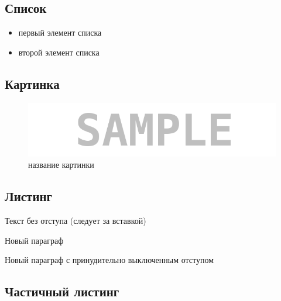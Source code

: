\subsection*{Список}

\begin{itemize}
\item первый элемент списка
\item второй элемент списка
\end{itemize}


\subsection*{Картинка}

\begin{figure}[H]
	\begin{center}
		\includegraphics[scale=0.7]{pics/sample}
		\caption{название картинки} 
		\label{pic:pic_name} %
	\end{center}
\end{figure}


\subsection*{Листинг}


\parindent=1cm %
Текст без отступа (следует за вставкой)

Новый параграф

\noindent Новый параграф с принудительно выключенным отступом


\subsection*{Частичный листинг}
\makeatletter
\def\lst@PlaceNumber{\llap{\normalfont
                \lst@numberstyle{\the\lst@lineno}\kern\lst@numbersep}}
\makeatother


\parindent=1cm

